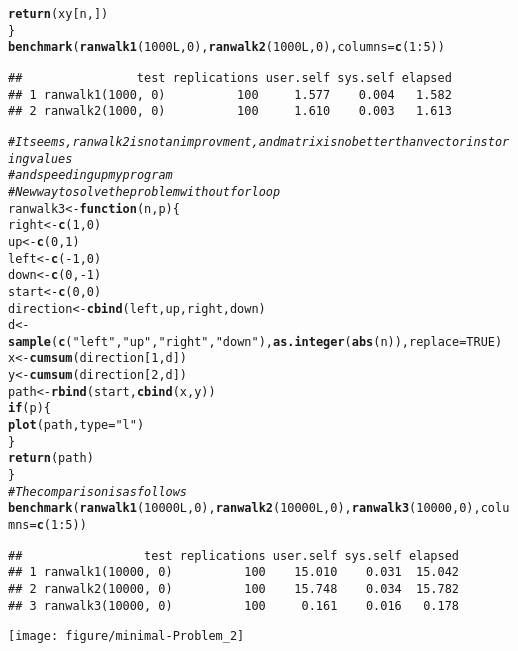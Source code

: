 \documentclass{article}\usepackage[]{graphicx}\usepackage[]{color}
\makeatletter
\def\maxwidth{ %
  \ifdim\Gin@nat@width>\linewidth
    \linewidth
  \else
    \Gin@nat@width
  \fi
}
\newcommand{\hlnum}[1]{\textcolor[rgb]{0.686,0.059,0.569}{#1}}%
\newcommand{\hlstr}[1]{\textcolor[rgb]{0.192,0.494,0.8}{#1}}%
\newcommand{\hlcom}[1]{\textcolor[rgb]{0.678,0.584,0.686}{\textit{#1}}}%
\newcommand{\hlopt}[1]{\textcolor[rgb]{0,0,0}{#1}}%
\newcommand{\hlstd}[1]{\textcolor[rgb]{0.345,0.345,0.345}{#1}}%
\newcommand{\hlkwa}[1]{\textcolor[rgb]{0.161,0.373,0.58}{\textbf{#1}}}%
\newcommand{\hlkwb}[1]{\textcolor[rgb]{0.69,0.353,0.396}{#1}}%
\newcommand{\hlkwc}[1]{\textcolor[rgb]{0.333,0.667,0.333}{#1}}%
\newcommand{\hlkwd}[1]{\textcolor[rgb]{0.737,0.353,0.396}{\textbf{#1}}}%
\newenvironment{kframe}{%
 \def\at@end@of@kframe{}%
 \ifinner\ifhmode%
  \def\at@end@of@kframe{\end{minipage}}%
  \begin{minipage}{\columnwidth}%
 \fi\fi%
 \def\FrameCommand##1{\hskip\@totalleftmargin \hskip-\fboxsep
 \colorbox{shadecolor}{##1}\hskip-\fboxsep
     \hskip-\linewidth \hskip-\@totalleftmargin \hskip\columnwidth}%
 \MakeFramed {\advance\hsize-\width
   \@totalleftmargin\z@ \linewidth\hsize
   \@setminipage}}%
 {\par\unskip\endMakeFramed%
 \at@end@of@kframe}
\newenvironment{knitrout}{}{} %
\makeatother
\begin{document}
\begin{knitrout}
\begin{kframe}
\begin{alltt}
    \hlkwd{return}\hlstd{(xy[n, ])}
\hlstd{\}}
\hlkwd{benchmark}\hlstd{(}\hlkwd{ranwalk1}\hlstd{(}\hlnum{1000L}\hlstd{,} \hlnum{0}\hlstd{),} \hlkwd{ranwalk2}\hlstd{(}\hlnum{1000L}\hlstd{,} \hlnum{0}\hlstd{),} \hlkwc{columns} \hlstd{=} \hlkwd{c}\hlstd{(}\hlnum{1}\hlopt{:}\hlnum{5}\hlstd{))}
\end{alltt}
\begin{verbatim}
##                test replications user.self sys.self elapsed
## 1 ranwalk1(1000, 0)          100     1.577    0.004   1.582
## 2 ranwalk2(1000, 0)          100     1.610    0.003   1.613
\end{verbatim}
\begin{alltt}
\hlcom{# It seems, ranwalk2 is not an improvment, and matrix is no better than vector in storing values}
\hlcom{# and speeding up my program}
\hlcom{# New way to solve the problem without forloop}
\hlstd{ranwalk3} \hlkwb{<-} \hlkwa{function}\hlstd{(}\hlkwc{n}\hlstd{,} \hlkwc{p}\hlstd{) \{}
    \hlstd{right} \hlkwb{<-} \hlkwd{c}\hlstd{(}\hlnum{1}\hlstd{,} \hlnum{0}\hlstd{)}
    \hlstd{up} \hlkwb{<-} \hlkwd{c}\hlstd{(}\hlnum{0}\hlstd{,} \hlnum{1}\hlstd{)}
    \hlstd{left} \hlkwb{<-} \hlkwd{c}\hlstd{(}\hlopt{-}\hlnum{1}\hlstd{,} \hlnum{0}\hlstd{)}
    \hlstd{down} \hlkwb{<-} \hlkwd{c}\hlstd{(}\hlnum{0}\hlstd{,} \hlopt{-}\hlnum{1}\hlstd{)}
    \hlstd{start} \hlkwb{<-} \hlkwd{c}\hlstd{(}\hlnum{0}\hlstd{,} \hlnum{0}\hlstd{)}
    \hlstd{direction} \hlkwb{<-} \hlkwd{cbind}\hlstd{(left, up, right, down)}
    \hlstd{d} \hlkwb{<-} \hlkwd{sample}\hlstd{(}\hlkwd{c}\hlstd{(}\hlstr{"left"}\hlstd{,} \hlstr{"up"}\hlstd{,} \hlstr{"right"}\hlstd{,} \hlstr{"down"}\hlstd{),} \hlkwd{as.integer}\hlstd{(}\hlkwd{abs}\hlstd{(n)),} \hlkwc{replace} \hlstd{=} \hlnum{TRUE}\hlstd{)}
    \hlstd{x} \hlkwb{<-} \hlkwd{cumsum}\hlstd{(direction[}\hlnum{1}\hlstd{, d])}
    \hlstd{y} \hlkwb{<-} \hlkwd{cumsum}\hlstd{(direction[}\hlnum{2}\hlstd{, d])}
    \hlstd{path} \hlkwb{<-} \hlkwd{rbind}\hlstd{(start,} \hlkwd{cbind}\hlstd{(x, y))}
    \hlkwa{if} \hlstd{(p) \{}
        \hlkwd{plot}\hlstd{(path,} \hlkwc{type} \hlstd{=} \hlstr{"l"}\hlstd{)}
    \hlstd{\}}
    \hlkwd{return}\hlstd{(path)}
\hlstd{\}}
\hlcom{# The comparison is as follows}
\hlkwd{benchmark}\hlstd{(}\hlkwd{ranwalk1}\hlstd{(}\hlnum{10000L}\hlstd{,} \hlnum{0}\hlstd{),} \hlkwd{ranwalk2}\hlstd{(}\hlnum{10000L}\hlstd{,} \hlnum{0}\hlstd{),} \hlkwd{ranwalk3}\hlstd{(}\hlnum{10000}\hlstd{,} \hlnum{0}\hlstd{),} \hlkwc{columns} \hlstd{=} \hlkwd{c}\hlstd{(}\hlnum{1}\hlopt{:}\hlnum{5}\hlstd{))}
\end{alltt}
\begin{verbatim}
##                 test replications user.self sys.self elapsed
## 1 ranwalk1(10000, 0)          100    15.010    0.031  15.042
## 2 ranwalk2(10000, 0)          100    15.748    0.034  15.782
## 3 ranwalk3(10000, 0)          100     0.161    0.016   0.178
\end{verbatim}
\end{kframe}

{\centering \texttt{[image: figure/minimal-Problem\_2]} 

}



\end{knitrout}
\end{document}
